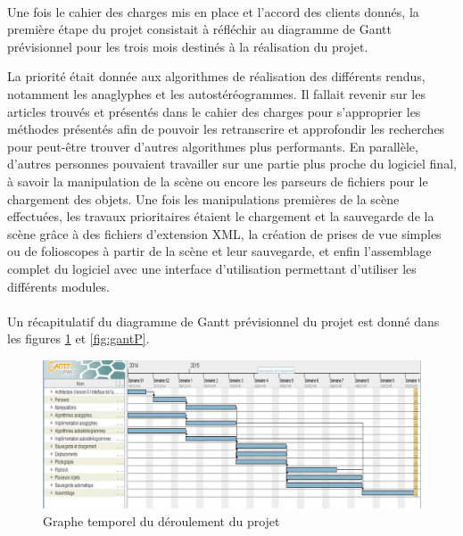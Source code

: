\paragraph{}
Une fois le cahier des charges mis en place et l'accord des clients donnés, la première étape du projet consistait à réfléchir au diagramme de Gantt prévisionnel pour les trois mois destinés à la réalisation du projet.

La priorité était donnée aux algorithmes de réalisation des différents rendus, notamment les anaglyphes et les autostéréogrammes. Il fallait revenir sur les articles trouvés et présentés dans le cahier des charges pour s'approprier les méthodes présentés afin de pouvoir les retranscrire et approfondir les recherches pour peut-être trouver d'autres algorithmes plus performants.
En parallèle, d'autres personnes pouvaient travailler sur une partie plus proche du logiciel final, à savoir la manipulation de la scène ou encore les parseurs de fichiers pour le chargement des objets.
Une fois les manipulations premières de la scène effectuées, les travaux prioritaires étaient le chargement et la sauvegarde de la scène grâce à des fichiers d'extension XML, la création de prises de vue simples ou de folioscopes à partir de la scène et leur sauvegarde, et enfin l'assemblage complet du logiciel avec une interface d'utilisation permettant d'utiliser les différents modules.


\paragraph{}
Un récapitulatif du diagramme de Gantt prévisionnel du projet est donné dans les figures \ref{fig:graphGantP} et \ref{fig:gantP}.

\newpage
\begin{figure}[h]
	\centering
	\begin{sideways}
                \includegraphics[scale=0.42]{graphGantP.jpg}
        \end{sideways}
	\caption{\label{fig:graphGantP} Graphe temporel du déroulement du projet \protect \footnotemark }
\end{figure}

